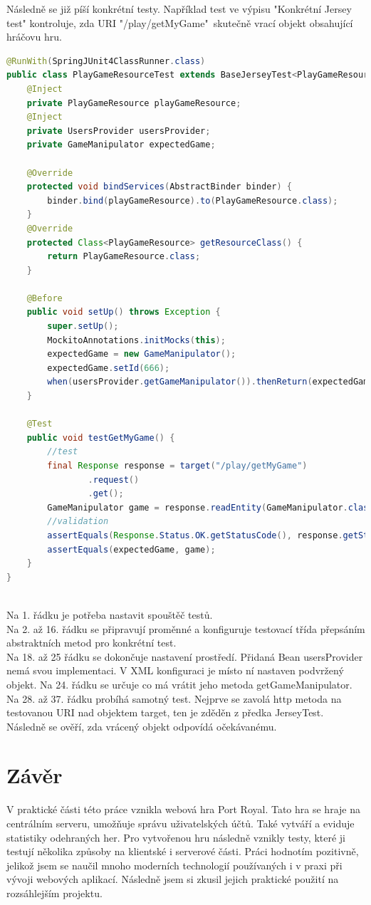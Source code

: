 \documentclass[czech,master,public,dept460,male,cpdeclaration,twoside]{diploma}
\begin{document}
Následně se již píší konkrétní testy. Například test ve výpisu "Konkrétní Jersey test" kontroluje, zda URI "/play/getMyGame"~skutečně vrací objekt obsahující hráčovu hru.
\\
\begin{lstlisting}[language=Java, caption=Konkrétní Jersey test]
@RunWith(SpringJUnit4ClassRunner.class)
public class PlayGameResourceTest extends BaseJerseyTest<PlayGameResource> {
    @Inject
    private PlayGameResource playGameResource;
    @Inject
    private UsersProvider usersProvider;
    private GameManipulator expectedGame;

    @Override
    protected void bindServices(AbstractBinder binder) {
        binder.bind(playGameResource).to(PlayGameResource.class);
    }
    @Override
    protected Class<PlayGameResource> getResourceClass() {
        return PlayGameResource.class;
    }
    
    @Before
    public void setUp() throws Exception {
        super.setUp();
        MockitoAnnotations.initMocks(this);
        expectedGame = new GameManipulator();
        expectedGame.setId(666);
        when(usersProvider.getGameManipulator()).thenReturn(expectedGame);
    }
    
    @Test
    public void testGetMyGame() {
        //test
        final Response response = target("/play/getMyGame")
                .request()
                .get();
        GameManipulator game = response.readEntity(GameManipulator.class);
        //validation
        assertEquals(Response.Status.OK.getStatusCode(), response.getStatus());
        assertEquals(expectedGame, game);
    }
}
\end{lstlisting}
~\\
Na 1. řádku je potřeba nastavit spouštěč testů.\\
Na 2. až 16. řádku se připravují proměnné a konfiguruje testovací třída přepsáním abstraktních metod pro konkrétní test.\\
Na 18. až 25 řádku se dokončuje nastavení prostředí. Přidaná Bean usersProvider nemá svou implementaci. V XML konfiguraci je místo ní nastaven podvržený objekt. Na 24. řádku se určuje co má vrátit jeho metoda getGameManipulator.\\
Na 28. až 37. řádku probíhá samotný test. Nejprve se zavolá http metoda na testovanou URI nad objektem target, ten je zděděn z předka JerseyTest. Následně se ověří, zda vrácený objekt odpovídá očekávanému.

\section{Závěr}
V praktické části této práce vznikla webová hra Port Royal. Tato hra se hraje na centrálním serveru, umožňuje správu uživatelských účtů. Také vytváří a eviduje statistiky odehraných her. Pro vytvořenou hru následně vznikly testy, které ji testují několika způsoby na klientské i serverové části. Práci hodnotím pozitivně, jelikož jsem se naučil mnoho moderních technologií používaných i v praxi při vývoji webových aplikací. Následně jsem si zkusil jejich praktické použití na rozsáhlejším projektu.
\end{document}
